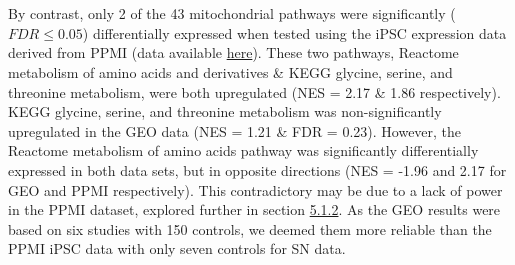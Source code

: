 \documentclass{article}
\begin{document}
\\
\\By contrast, only 2 of the 43 mitochondrial pathways were significantly ($FDR \leq 0.05$) differentially expressed when tested using the iPSC expression data derived from PPMI (data available \href{https://github.com/Thomas-brightwell/PD-MSc-project-code/blob/main/Thesis/Supplementary%20materials/PPMI_gsea_results.csv}{here}). These two pathways, Reactome metabolism of amino acids and derivatives \& KEGG glycine, serine, and threonine metabolism, were both upregulated (NES = 2.17 \& 1.86 respectively). KEGG glycine, serine, and threonine metabolism was non-significantly upregulated in the GEO data (NES = 1.21 \& FDR = 0.23). However, the Reactome metabolism of amino acids pathway was significantly differentially expressed in both data sets, but in opposite directions (NES = -1.96 and 2.17 for GEO and PPMI respectively). This contradictory may be due to a lack of power in the PPMI dataset, explored further in section \hyperref[subsubsec:GEOandPPMI]{5.1.2}. As the GEO results were based on six studies with 150 controls, we deemed them more reliable than the PPMI iPSC data with only seven controls for SN data.
\end{document}
